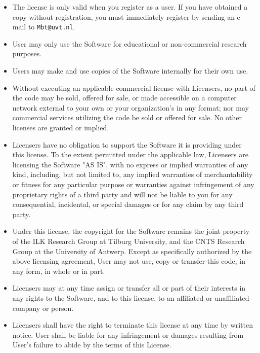 \documentclass{report}
\begin{document}
\begin{itemize}

\item The license is only valid when you register as a user. If you
have obtained a copy without registration, you must immediately
register by sending an e-mail to {\tt Mbt@uvt.nl}.

\item User may only use the Software for educational or non-commercial
research purposes.

\item Users may make and use copies of the Software internally for
their own use.

\item Without executing an applicable commercial license with
Licensers, no part of the code may be sold, offered for sale, or made
accessible on a computer network external to your own or your
organization's in any format; nor may commercial services utilizing
the code be sold or offered for sale. No other licenses are granted or
implied.

\item Licensers have no obligation to support the Software it is
providing under this license.  To the extent permitted under the
applicable law, Licensers are licensing the Software "AS IS", with no
express or implied warranties of any kind, including, but not limited
to, any implied warranties of merchantability or fitness for any
particular purpose or warranties against infringement of any
proprietary rights of a third party and will not be liable to you for
any consequential, incidental, or special damages or for any claim by
any third party.

\item Under this license, the copyright for the Software remains the
joint property of the ILK Research Group at Tilburg University, and
the CNTS Research Group at the University of Antwerp.  Except as
specifically authorized by the above licensing agreement, User may not
use, copy or transfer this code, in any form, in whole or in part.

\item Licensers may at any time assign or transfer all or part of their
interests in any rights to the Software, and to this license, to an
affiliated or unaffiliated company or person.

\item Licensers shall have the right to terminate this license at any
time by written notice. User shall be liable for any infringement or
damages resulting from User's failure to abide by the terms of this
License.


\end{itemize}
\end{document}
